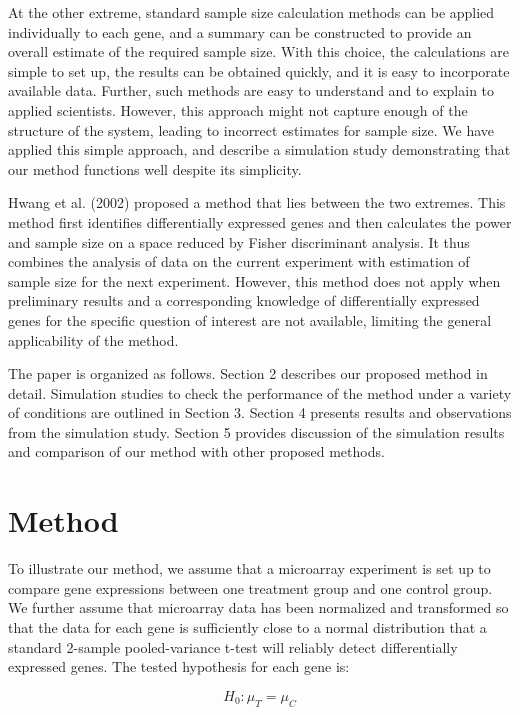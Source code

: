 \documentclass[12pt]{article}
\begin{document}
At the other extreme, standard sample size calculation methods can
be applied individually to each gene, and a summary can be
constructed to provide an overall estimate of the required sample
size.  With this choice, the calculations are simple to set up, the
results can be obtained quickly, and it is easy to incorporate
available data. Further, such methods are easy to understand and to
explain to applied scientists.  However, this approach might not
capture enough of the structure of the system, leading to incorrect
estimates for sample size.  We have applied this simple approach,
and describe a simulation study demonstrating that our method
functions well despite its simplicity.

Hwang et al. (2002) proposed a method that lies between the two
extremes.  This method first identifies differentially expressed
genes and then calculates the power and sample size on a space
reduced by Fisher discriminant analysis. It thus combines the
analysis of data on the current experiment with estimation of sample
size for the next experiment. However, this method does not apply
when preliminary results and a corresponding knowledge of
differentially expressed genes for the specific question of interest
are not available, limiting the general applicability of the
method.

The paper is organized as follows. Section 2 describes our proposed
method in detail. Simulation studies to check the performance of the
method under a variety of conditions are outlined in Section 3.
Section 4 presents results and observations from the simulation
study.  Section 5 provides discussion of the simulation results and
comparison of our method with other proposed methods.

\section{Method}
To illustrate our method, we assume that a microarray experiment is
set up to compare gene expressions between one treatment group and
one control group. We further assume that microarray data has been
normalized and transformed so that the data for each gene is
sufficiently close to a normal distribution that a standard 2-sample
pooled-variance t-test will reliably detect differentially expressed
genes. The tested hypothesis for each gene is:

\begin{equation}
  H_0: \mu_{T} = \mu_{C}  \nonumber
\end{equation}
\end{document}
